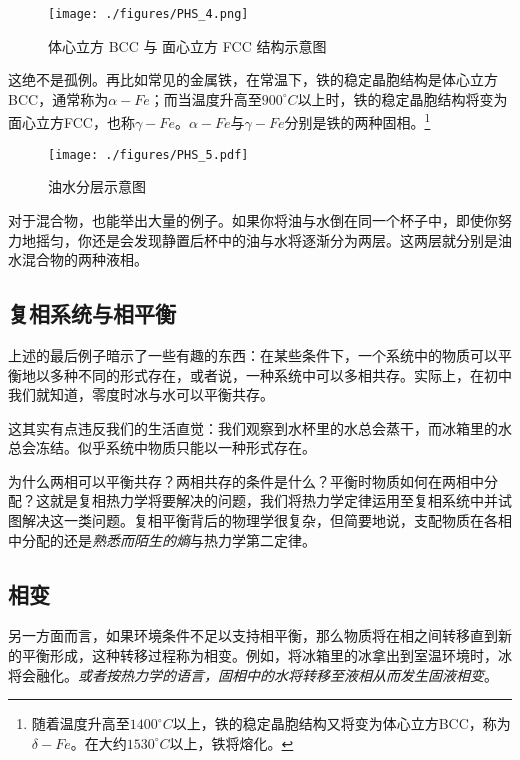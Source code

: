 \begin{figure}[ht]
\centering
\texttt{[image: ./figures/PHS\_4.png]}
\caption{体心立方 BCC 与 面心立方 FCC 结构示意图} \label{PHS_fig4}
\end{figure}
这绝不是孤例。再比如常见的金属铁，在常温下，铁的稳定晶胞结构是体心立方BCC，通常称为$\alpha-Fe$；而当温度升高至$900 ^\circ C$以上时，铁的稳定晶胞结构将变为面心立方FCC，也称$\gamma-Fe$。$\alpha-Fe$与$\gamma-Fe$分别是铁的两种固相。\footnote{随着温度升高至$1400 ^\circ C$以上，铁的稳定晶胞结构又将变为体心立方BCC，称为$\delta - Fe$。在大约$1530 ^\circ C$以上，铁将熔化。}

\begin{figure}[ht]
\centering
\texttt{[image: ./figures/PHS\_5.pdf]}
\caption{油水分层示意图} \label{PHS_fig5}
\end{figure}
对于混合物，也能举出大量的例子。如果你将油与水倒在同一个杯子中，即使你努力地摇匀，你还是会发现静置后杯中的油与水将逐渐分为两层。这两层就分别是油水混合物的两种液相。


\subsection{复相系统与相平衡}
上述的最后例子暗示了一些有趣的东西：在某些条件下，一个系统中的物质可以平衡地以多种不同的形式存在，或者说，一种系统中可以多相共存。实际上，在初中我们就知道，零度时冰与水可以平衡共存。

这其实有点违反我们的生活直觉：我们观察到水杯里的水总会蒸干，而冰箱里的水总会冻结。似乎系统中物质只能以一种形式存在。

为什么两相可以平衡共存？两相共存的条件是什么？平衡时物质如何在两相中分配？这就是复相热力学将要解决的问题，我们将热力学定律运用至复相系统中并试图解决这一类问题。复相平衡背后的物理学很复杂，但简要地说，支配物质在各相中分配的还是\textsl{熟悉而陌生的熵}与热力学第二定律。

\subsection{相变}
另一方面而言，如果环境条件不足以支持相平衡，那么物质将在相之间转移直到新的平衡形成，这种转移过程称为相变。例如，将冰箱里的冰拿出到室温环境时，冰将会融化。\textsl{或者按热力学的语言，固相中的水将转移至液相从而发生固液相变}。

